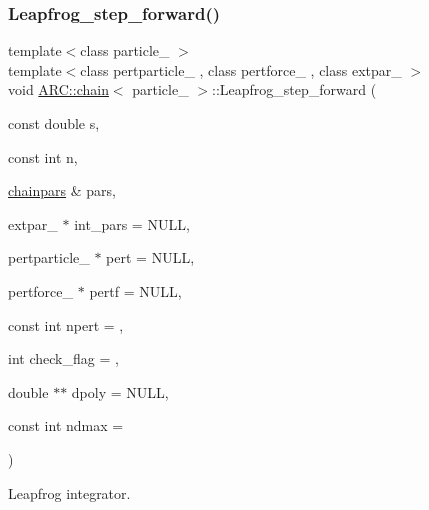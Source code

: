 \subsubsection{\texorpdfstring{Leapfrog\+\_\+step\+\_\+forward()}{Leapfrog\_step\_forward()}}
{\footnotesize\ttfamily template$<$class particle\+\_\+ $>$ \\
template$<$class pertparticle\+\_\+ , class pertforce\+\_\+ , class extpar\+\_\+ $>$ \\
void \hyperlink{classARC_1_1chain}{A\+R\+C\+::chain}$<$ particle\+\_\+ $>$\+::Leapfrog\+\_\+step\+\_\+forward (\begin{DoxyParamCaption}\item[{const double}]{s,  }\item[{const int}]{n,  }\item[{\hyperlink{classARC_1_1chainpars}{chainpars} \&}]{pars,  }\item[{extpar\+\_\+ $\ast$}]{int\+\_\+pars = {\ttfamily NULL},  }\item[{pertparticle\+\_\+ $\ast$}]{pert = {\ttfamily NULL},  }\item[{pertforce\+\_\+ $\ast$}]{pertf = {\ttfamily NULL},  }\item[{const int}]{npert = {},  }\item[{int}]{check\+\_\+flag = {},  }\item[{double $\ast$$\ast$}]{dpoly = {\ttfamily NULL},  }\item[{const int}]{ndmax = {} }\end{DoxyParamCaption})\hspace{0.3cm}{\ttfamily [inline]}}



Leapfrog integrator. 

